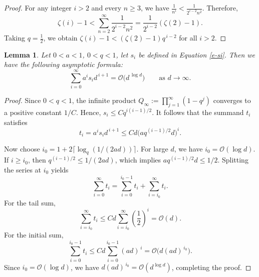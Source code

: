 \documentclass[reqno, 12pt]{article}
\newtheorem{lem}[thm]{Lemma}
\theoremstyle{mydefinition}
\theoremstyle{myremark}
\numberwithin{algorithm}{section}
\begin{document}
\begin{proof}
    For any integer $i > 2$ and every $n \ge 3$, we have $\frac{1}{n^{i}} < \frac{1}{2^{i-2} n^{2}}$.
    Therefore,
    \[
        \zeta(i)-1 < \sum_{n=2}^{\infty} \frac{1}{2^{i-2} n^{2}} = \frac{1}{2^{i-2}} (\zeta(2)-1).
    \]
    Taking $q = \frac{1}{2}$, we obtain $\zeta(i)-1 < (\zeta(2)-1) q^{\,i-2}$ for all $i > 2$.
\end{proof}



\begin{lem}\label{lem-average-poly-time}
    Let $0 < a < 1$, $0 < q < 1$, let $s_i$ be defined in Equation \eqref{e-si}.
Then we have the following asymptotic formula:
    \[
        \sum_{i=0}^{\infty} a^{i} s_{i} d^{\,i+1} = \mathcal{O}\bigl(d^{\,\log d}\bigr) \qquad \text{as } d \to \infty. 
    \]
\end{lem}
\begin{proof}
    Since $0 < q < 1$, the infinite product $Q_\infty := \prod_{j=1}^\infty (1 - q^j)$ converges to a positive constant $1/C$.
    Hence, $s_i \le C q^{i(i-1)/2}$. It follows that the summand $t_i $ satisfies
    \[
        t_i = a^i s_i d^{\,i+1} \le C d \bigl( a q^{(i-1)/2} d \bigr)^{\!i}.
    \]

Now choose $i_0 = 1 + 2\lceil \log_q(1/(2ad)) \rceil$. For large $d$, we have $i_0 = \mathcal{O}(\log d)$.
    If $i \ge i_0$, then $q^{(i-1)/2} \le 1/(2ad)$, which implies $a q^{(i-1)/2} d \le 1/2$.
    Splitting the series at $i_0$ yields
    \[
        \sum_{i=0}^\infty t_i = \sum_{i=0}^{i_0-1} t_i + \sum_{i=i_0}^\infty t_i.
    \]
    For the tail sum,
    \[
        \sum_{i=i_0}^\infty t_i \le C d \sum_{i=i_0}^\infty \left(\frac12\right)^{\!i} = \mathcal{O}(d).
    \]
    For the initial sum,
    \[
        \sum_{i=0}^{i_0-1} t_i \le C d \sum_{i=0}^{i_0-1} (ad)^{\,i} = \mathcal{O}\bigl(d (ad)^{\,i_0}\bigr).
    \]
    Since $i_0 = \mathcal{O}(\log d)$, we have $d (ad)^{\,i_0} = \mathcal{O}(d^{\log d})$, completing the proof.
\end{proof}
\end{document}
